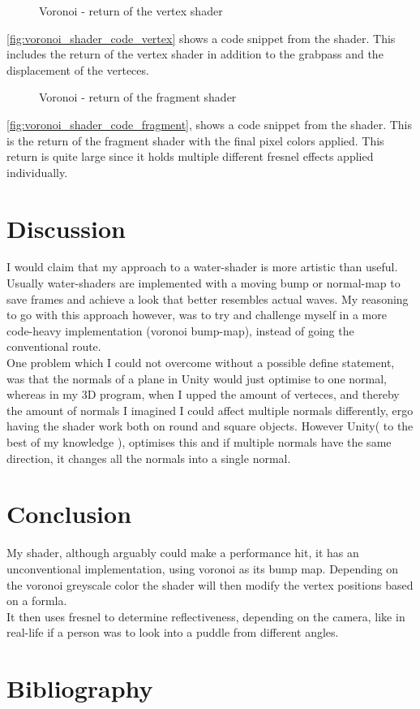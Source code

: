\documentclass{article}
\begin{document}
\begin{figure}[H]
    \centering
    
    \caption{Voronoi - return of the vertex shader}
    \label{fig:voronoi_shader_code_vertex}
\end{figure}
\autoref{fig:voronoi_shader_code_vertex} shows a code snippet from the shader. This includes the return of the vertex shader in addition to the grabpass and the displacement of the verteces.

\begin{figure}[H]
    \centering
    
    \caption{Voronoi - return of the fragment shader}
    \label{fig:voronoi_shader_code_fragment}
\end{figure}
\autoref{fig:voronoi_shader_code_fragment}, shows a code snippet from the shader. This is the return of the fragment shader with the final pixel colors applied. This return is quite large since it holds multiple different fresnel effects applied individually.

\section{Discussion}
\label{sec:discussion}
I would claim that my approach to a water-shader is more artistic than useful. Usually water-shaders are implemented with a moving bump or normal-map to save frames and achieve a look that better resembles actual waves. My reasoning to go with this approach however, was to try and challenge myself in a more code-heavy implementation (voronoi bump-map), instead of going the conventional route.\\

One problem which I could not overcome without a possible define statement, was that the normals of a plane in Unity would just optimise to one normal, whereas in my 3D program, when I upped the amount of verteces, and thereby the amount of normals I imagined I could affect multiple normals differently, ergo having the shader work both on round and square objects. However Unity( to the best of my knowledge ), optimises this and if multiple normals have the same direction, it changes all the normals into a single normal.

\section{Conclusion}
\label{sec:conclusion}
My shader, although arguably could make a performance hit, it has an unconventional implementation, using voronoi as its bump map. Depending on the voronoi greyscale color the shader will then modify the vertex positions based on a formla.\\It then uses fresnel to determine reflectiveness, depending on the camera, like in real-life if a person was to look into a puddle from different angles.


\section{Bibliography}
\printbibliography
\end{document}
